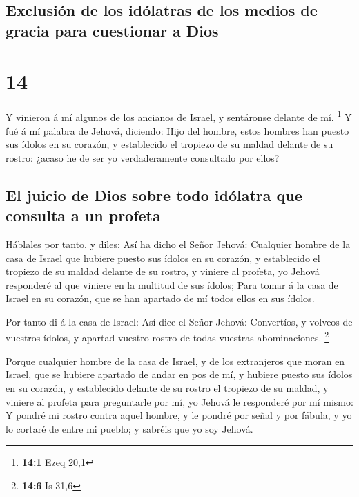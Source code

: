 \hypertarget{exclusiuxf3n-de-los-iduxf3latras-de-los-medios-de-gracia-para-cuestionar-a-dios}{%
\subsection{Exclusión de los idólatras de los medios de gracia para
cuestionar a
Dios}\label{exclusiuxf3n-de-los-iduxf3latras-de-los-medios-de-gracia-para-cuestionar-a-dios}}

\hypertarget{section-13}{%
\section{14}\label{section-13}}

 Y vinieron á mí algunos de los ancianos de Israel, y
sentáronse delante de mí. \footnote{\textbf{14:1} Ezeq 20,1}
 Y fué á mí palabra de Jehová, diciendo: 
Hijo del hombre, estos hombres han puesto sus ídolos en su corazón, y
establecido el tropiezo de su maldad delante de su rostro: ¿acaso he de
ser yo verdaderamente consultado por ellos?

\hypertarget{el-juicio-de-dios-sobre-todo-iduxf3latra-que-consulta-a-un-profeta}{%
\subsection{El juicio de Dios sobre todo idólatra que consulta a un
profeta}\label{el-juicio-de-dios-sobre-todo-iduxf3latra-que-consulta-a-un-profeta}}

 Háblales por tanto, y diles: Así ha dicho el Señor
Jehová: Cualquier hombre de la casa de Israel que hubiere puesto sus
ídolos en su corazón, y establecido el tropiezo de su maldad delante de
su rostro, y viniere al profeta, yo Jehová responderé al que viniere en
la multitud de sus ídolos;  Para tomar á la casa de Israel
en su corazón, que se han apartado de mí todos ellos en sus ídolos.

 Por tanto di á la casa de Israel: Así dice el Señor
Jehová: Convertíos, y volveos de vuestros ídolos, y apartad vuestro
rostro de todas vuestras abominaciones. \footnote{\textbf{14:6} Is 31,6}

 Porque cualquier hombre de la casa de Israel, y de los
extranjeros que moran en Israel, que se hubiere apartado de andar en pos
de mí, y hubiere puesto sus ídolos en su corazón, y establecido delante
de su rostro el tropiezo de su maldad, y viniere al profeta para
preguntarle por mí, yo Jehová le responderé por mí mismo: 
Y pondré mi rostro contra aquel hombre, y le pondré por señal y por
fábula, y yo lo cortaré de entre mi pueblo; y sabréis que yo soy Jehová.

